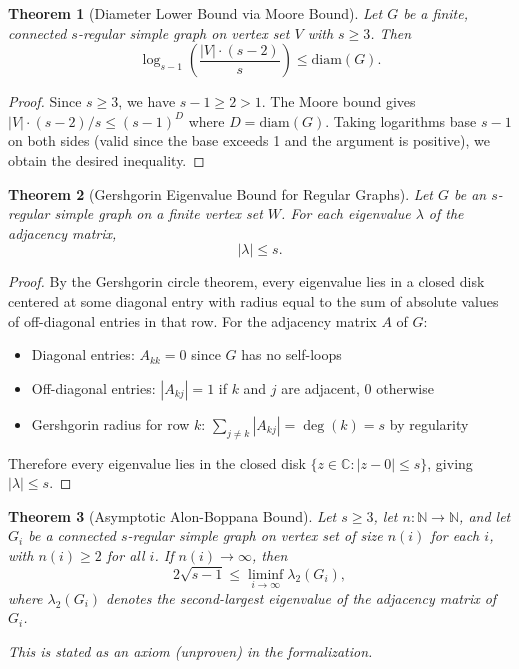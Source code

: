 \documentclass[11pt]{article}
\theoremstyle{plain}
\newtheorem*{theorem}{Theorem}
\theoremstyle{definition}
\theoremstyle{remark}
\begin{document}
\begin{theorem}[Diameter Lower Bound via Moore Bound]
Let $G$ be a finite, connected $s$-regular simple graph on vertex set $V$ with $s \geq 3$. Then
\[
\log_{s-1}\left(\frac{|V| \cdot (s-2)}{s}\right) \leq \text{diam}(G).
\]
\end{theorem}

\begin{proof}
Since $s \geq 3$, we have $s-1 \geq 2 > 1$. The Moore bound gives $|V| \cdot (s-2)/s \leq (s-1)^D$ where $D = \text{diam}(G)$. Taking logarithms base $s-1$ on both sides (valid since the base exceeds 1 and the argument is positive), we obtain the desired inequality.
\end{proof}

\begin{theorem}[Gershgorin Eigenvalue Bound for Regular Graphs]
Let $G$ be an $s$-regular simple graph on a finite vertex set $W$. For each eigenvalue $\lambda$ of the adjacency matrix,
\[
|\lambda| \leq s.
\]
\end{theorem}

\begin{proof}
By the Gershgorin circle theorem, every eigenvalue lies in a closed disk centered at some diagonal entry with radius equal to the sum of absolute values of off-diagonal entries in that row. For the adjacency matrix $A$ of $G$:
\begin{itemize}
\item Diagonal entries: $A_{kk} = 0$ since $G$ has no self-loops
\item Off-diagonal entries: $|A_{kj}| = 1$ if $k$ and $j$ are adjacent, $0$ otherwise
\item Gershgorin radius for row $k$: $\sum_{j \neq k} |A_{kj}| = \deg(k) = s$ by regularity
\end{itemize}
Therefore every eigenvalue lies in the closed disk $\{z \in \mathbb{C} : |z - 0| \leq s\}$, giving $|\lambda| \leq s$.
\end{proof}

\begin{theorem}[Asymptotic Alon-Boppana Bound]
Let $s \geq 3$, let $n : \mathbb{N} \to \mathbb{N}$, and let $G_i$ be a connected $s$-regular simple graph on vertex set of size $n(i)$ for each $i$, with $n(i) \geq 2$ for all $i$. If $n(i) \to \infty$, then
\[
2\sqrt{s-1} \leq \liminf_{i \to \infty} \lambda_2(G_i),
\]
where $\lambda_2(G_i)$ denotes the second-largest eigenvalue of the adjacency matrix of $G_i$.

\textit{This is stated as an axiom (unproven) in the formalization.}
\end{theorem}
\end{document}
